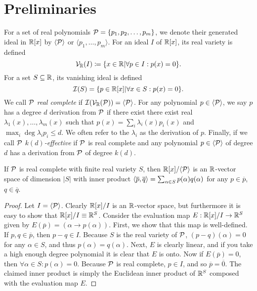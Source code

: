 \section{Preliminaries}
\label{sec:prelims}
For a set of real polynomials $\mathcal P = \{p_1, p_2, \dots, p_m\}$, we denote their generated ideal in $\mathbb R[x]$ by $\langle \mathcal P\rangle$ or $\langle p_1, \dots, p_m\rangle$. For an ideal $I$ of $\mathbb R[x]$, its real variety is defined 
\[\mathcal V_\mathbb R(I) \coloneqq \{x \in \mathbb R | \forall p \in I: p(x) = 0\}.\]
For a set $S \subseteq \mathbb R$, its vanishing ideal is defined
\[\mathcal I(S) = \{p \in \mathbb R[x] | \forall x \in S: p(x) = 0\}.\]
We call $\mathcal P$ \emph{real complete} if $\mathcal I(\mathcal V_\mathbb R(\mathcal P)) = \langle \mathcal P\rangle$. For any polynomial $p \in \langle \mathcal P\rangle$, we say $p$ has a degree $d$ derivation from $\mathcal P$ if there exist there exist real $\lambda_1(x),\dots,\lambda_m(x)$ such that $p(x) = \sum_i \lambda_i(x)p_i(x)$ and $\max_i \deg \lambda_ip_i \leq d$. We often refer to the $\lambda_i$ as the derivation of $p$. Finally, if we call $\mathcal P$ \emph{$k(d)$-effective} if $\mathcal P$ is real complete and any polynomial $p \in \langle \mathcal P\rangle$ of degree $d$ has a derivation from $\mathcal P$ of degree $k(d)$. 
\begin{lemma}
If $\mathcal P$ is real complete with finite real variety $S$, then $\mathbb R[x]/\langle \mathcal P\rangle$ is an $\mathbb R$-vector space of dimension $|S|$ with inner product $\langle\overline{p}, \overline{q}\rangle= \sum_{\alpha \in S} p(\alpha)q(\alpha)$ for any $p \in \overline{p}$, $q \in \overline{q}$.
\end{lemma}
\begin{proof}
Let $I = \langle \mathcal P\rangle$. Clearly $\mathbb R[x]/I$ is an $\mathbb R$-vector space, but furthermore it is easy to show that $\mathbb R[x]/I \equiv \mathbb R^S$. Consider the evaluation map $E: \mathbb R[x]/I \rightarrow \mathbb R^S$ given by $E(\overline{p}) = (\alpha \rightarrow p(\alpha))$. First, we show that this map is well-defined. If $p,q \in \overline{p}$, then $p-q \in I$. Because $S$ is the real variety of $\mathcal P$, $(p-q)(\alpha) = 0$ for any $\alpha \in S$, and thus $p(\alpha) = q(\alpha)$. Next, $E$ is clearly linear, and if you take a high enough degree polynomial it is clear that $E$ is onto. Now if $E(\overline{p}) = 0$, then $\forall \alpha \in S: p(\alpha) = 0$. Because $\mathcal P$ is real complete, $p \in I$, and so $\overline{p} = \overline{0}$. The claimed inner product is simply the Euclidean inner product of $\mathbb R^S$ composed with the evaluation map $E$. 
\end{proof}

